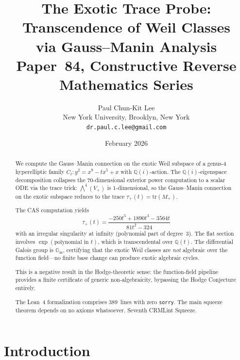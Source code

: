 \documentclass[11pt]{article}
\theoremstyle{plain}
\theoremstyle{definition}
\theoremstyle{remark}
\newcommand{\Q}{\mathbb{Q}}
\newcommand{\tr}{\mathrm{tr}}
\newcommand{\Gm}{\mathbb{G}_{\mathrm{m}}}
\begin{document}
\title{The Exotic Trace Probe: Transcendence of Weil Classes\\
via Gauss--Manin Analysis\\[6pt]
\large Paper~84, Constructive Reverse Mathematics Series}

\author{Paul Chun-Kit Lee\\
\small New York University, Brooklyn, New York\\
\small \texttt{dr.paul.c.lee@gmail.com}}

\date{February 2026}

\maketitle

\begin{abstract}
We compute the Gauss--Manin connection on the exotic Weil subspace of a
genus-4 hyperelliptic family $C_t: y^2 = x^9 - tx^5 + x$ with $\Q(i)$-action.
The $\Q(i)$-eigenspace decomposition collapses the $70$-dimensional exterior
power computation to a scalar ODE via the trace trick: $\bigwedge^4(V_+)$
is $1$-dimensional, so the Gauss--Manin connection on the exotic subspace
reduces to the trace $\tau_+(t) = \tr(M_+)$.

The CAS computation yields
\[
\tau_+(t) = \frac{-250t^5 + 1890t^3 - 3564t}{81t^2 - 324}
\]
with an irregular singularity at infinity (polynomial part of degree~3).
The flat section involves $\exp(\text{polynomial in } t)$, which is
transcendental over $\Q(t)$. The differential Galois group is $\Gm$,
certifying that the exotic Weil classes are \emph{not} algebraic over
the function field---no finite base change can produce exotic algebraic cycles.

This is a negative result in the Hodge-theoretic sense: the function-field
pipeline provides a finite certificate of generic non-algebraicity, bypassing
the Hodge Conjecture entirely.

The Lean~4 formalization comprises 389~lines with zero \texttt{sorry}.
The main squeeze theorem depends on no axioms whatsoever.
Seventh CRMLint Squeeze.
\end{abstract}

\section{Introduction}
\end{document}
